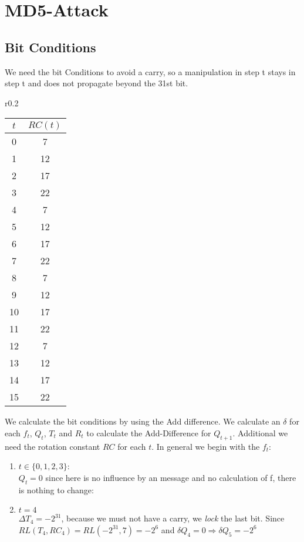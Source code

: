 \chapter{ MD5-Attack}
\label{chapter:kap3}

\section{Bit Conditions}
We need the bit Conditions to avoid a carry, so a manipulation in step t stays in step t and does not propagate beyond the 31st bit.\\
\begin{wrapfigure}[]{r}{0.2\textwidth}
        \begin{tabular}{| c | c |}
            \hline
            $t$ & $RC(t)$    \\
            \hline
            \hline
            0  & 7 \\
            1  & 12 \\
            2  & 17 \\
            3  & 22 \\
            4  & 7 \\
            5  & 12 \\
            6  & 17 \\
            7  & 22 \\
            8  & 7 \\
            9  & 12 \\
            10 & 17 \\
            11 & 22 \\
            12 & 7 \\
            13 & 12 \\
            14 & 17 \\
            15 & 22 \\
            \hline
        \end{tabular}
        \label{RC}
    \end{wrapfigure}
We calculate the bit conditions by using the Add difference.
We calculate an $\delta$ for each $f_t$, $Q_t$, $T_t$ and $R_t$ to calculate the Add-Difference for $Q_{t+1}$.
Additional we need the rotation constant $RC$ for each $t$. 
In general we begin with the $f_t$:
\begin{enumerate}
    \item $t \in \{0,1,2,3\}$:\\
     $Q_t = 0 $ since here is no influence by an message and no calculation of f, there is nothing to change:
    \item $t = 4$\\
    $\Delta T_4 = -2^{31}$, because we must not have a carry, we \textit{lock} the last bit.
    Since  $RL(T_4, RC_4) = RL(-2^{31}, 7) = -2^6 $ and $\delta Q_4 = 0 \Rightarrow  \delta Q_5 = -2^6$  
\end{enumerate}
